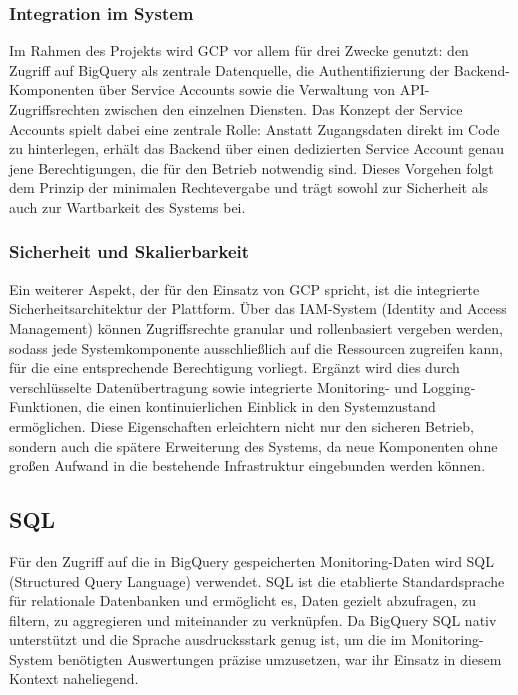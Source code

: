 \subsubsection{Integration im System}
Im Rahmen des Projekts wird GCP vor allem für drei Zwecke genutzt: den Zugriff auf BigQuery als zentrale Datenquelle, die Authentifizierung der Backend-Komponenten über Service Accounts sowie die Verwaltung von API-Zugriffsrechten zwischen den einzelnen Diensten. Das Konzept der Service Accounts spielt dabei eine zentrale Rolle: Anstatt Zugangsdaten direkt im Code zu hinterlegen, erhält das Backend über einen dedizierten Service Account genau jene Berechtigungen, die für den Betrieb notwendig sind. Dieses Vorgehen folgt dem Prinzip der minimalen Rechtevergabe und trägt sowohl zur Sicherheit als auch zur Wartbarkeit des Systems bei.

\subsubsection{Sicherheit und Skalierbarkeit}
Ein weiterer Aspekt, der für den Einsatz von GCP spricht, ist die integrierte Sicherheitsarchitektur der Plattform. Über das IAM-System (Identity and Access Management) können Zugriffsrechte granular und rollenbasiert vergeben werden, sodass jede Systemkomponente ausschließlich auf die Ressourcen zugreifen kann, für die eine entsprechende Berechtigung vorliegt. Ergänzt wird dies durch verschlüsselte Datenübertragung sowie integrierte Monitoring- und Logging-Funktionen, die einen kontinuierlichen Einblick in den Systemzustand ermöglichen. Diese Eigenschaften erleichtern nicht nur den sicheren Betrieb, sondern auch die spätere Erweiterung des Systems, da neue Komponenten ohne großen Aufwand in die bestehende Infrastruktur eingebunden werden können.


\subsection{SQL}
Für den Zugriff auf die in BigQuery gespeicherten Monitoring-Daten wird SQL (Structured Query Language) verwendet. SQL ist die etablierte Standardsprache für relationale Datenbanken und ermöglicht es, Daten gezielt abzufragen, zu filtern, zu aggregieren und miteinander zu verknüpfen. \cite{sql_iso, sql_intro} Da BigQuery SQL nativ unterstützt und die Sprache ausdrucksstark genug ist, um die im Monitoring-System benötigten Auswertungen präzise umzusetzen, war ihr Einsatz in diesem Kontext naheliegend.

